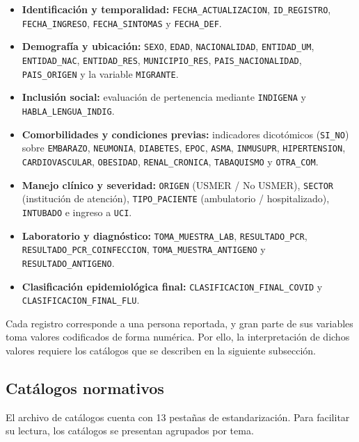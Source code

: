 \begin{itemize}
    \item \textbf{Identificación y temporalidad:} \texttt{FECHA\_ACTUALIZACION}, \texttt{ID\_REGISTRO}, \texttt{FECHA\_INGRESO}, \texttt{FECHA\_SINTOMAS} y \texttt{FECHA\_DEF}.
    \item \textbf{Demografía y ubicación:} \texttt{SEXO}, \texttt{EDAD}, \texttt{NACIONALIDAD}, \texttt{ENTIDAD\_UM}, \texttt{ENTIDAD\_NAC}, \texttt{ENTIDAD\_RES}, \texttt{MUNICIPIO\_RES}, \texttt{PAIS\_NACIONALIDAD}, \texttt{PAIS\_ORIGEN} y la variable \texttt{MIGRANTE}.
    \item \textbf{Inclusión social:} evaluación de pertenencia mediante \texttt{INDIGENA} y \texttt{HABLA\_LENGUA\_INDIG}.
    \item \textbf{Comorbilidades y condiciones previas:} indicadores dicotómicos (\texttt{SI\_NO}) sobre \texttt{EMBARAZO}, \texttt{NEUMONIA}, \texttt{DIABETES}, \texttt{EPOC}, \texttt{ASMA}, \texttt{INMUSUPR}, \texttt{HIPERTENSION}, \texttt{CARDIOVASCULAR}, \texttt{OBESIDAD}, \texttt{RENAL\_CRONICA}, \texttt{TABAQUISMO} y \texttt{OTRA\_COM}.
    \item \textbf{Manejo clínico y severidad:} \texttt{ORIGEN} (USMER / No USMER), \texttt{SECTOR} (institución de atención), \texttt{TIPO\_PACIENTE} (ambulatorio / hospitalizado), \texttt{INTUBADO} e ingreso a \texttt{UCI}.
    \item \textbf{Laboratorio y diagnóstico:} \texttt{TOMA\_MUESTRA\_LAB}, \texttt{RESULTADO\_PCR}, \texttt{RESULTADO\_PCR\_COINFECCION}, \texttt{TOMA\_MUESTRA\_ANTIGENO} y \texttt{RESULTADO\_ANTIGENO}.
    \item \textbf{Clasificación epidemiológica final:} \texttt{CLASIFICACION\_FINAL\_COVID} y \texttt{CLASIFICACION\_FINAL\_FLU}.
\end{itemize}

Cada registro corresponde a una persona reportada, y gran parte de sus variables toma valores codificados de forma numérica. Por ello, la interpretación de dichos valores requiere los catálogos que se describen en la siguiente subsección.

\subsection{Catálogos normativos}

El archivo de catálogos cuenta con 13 pestañas de estandarización. Para facilitar su lectura, los catálogos se presentan agrupados por tema.

